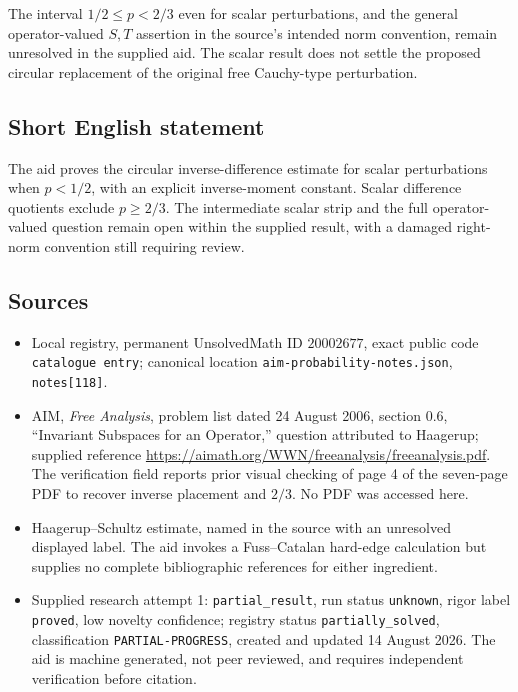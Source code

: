 \documentclass[11pt]{article}
\begin{document}
The interval \(1/2\le p<2/3\) even for scalar perturbations, and the general operator-valued \(S,T\) assertion in the source's intended norm convention, remain unresolved in the supplied aid. The scalar result does not settle the proposed circular replacement of the original free Cauchy-type perturbation.
\subsection{Short English statement}
The aid proves the circular inverse-difference estimate for scalar perturbations when \(p<1/2\), with an explicit inverse-moment constant. Scalar difference quotients exclude \(p\ge2/3\). The intermediate scalar strip and the full operator-valued question remain open within the supplied result, with a damaged right-norm convention still requiring review.
\subsection{Sources}
\begin{itemize}
\item Local registry, permanent UnsolvedMath ID \(20002677\), exact public code \texttt{catalogue entry}; canonical location \texttt{aim-probability-notes.json}, \texttt{notes[118]}.
\item AIM, \emph{Free Analysis}, problem list dated 24 August 2006, section 0.6, ``Invariant Subspaces for an Operator,'' question attributed to Haagerup; supplied reference \url{https://aimath.org/WWN/freeanalysis/freeanalysis.pdf}. The verification field reports prior visual checking of page 4 of the seven-page PDF to recover inverse placement and \(2/3\). No PDF was accessed here.
\item Haagerup--Schultz estimate, named in the source with an unresolved displayed label. The aid invokes a Fuss--Catalan hard-edge calculation but supplies no complete bibliographic references for either ingredient.
\item Supplied research attempt 1: \texttt{partial\_result}, run status \texttt{unknown}, rigor label \texttt{proved}, low novelty confidence; registry status \texttt{partially\_solved}, classification \texttt{PARTIAL-PROGRESS}, created and updated 14 August 2026. The aid is machine generated, not peer reviewed, and requires independent verification before citation.
\end{itemize}
\end{document}
